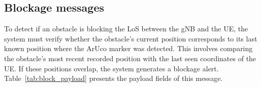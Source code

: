 \begin{table}[H]
    \caption{Components of the Prior to Blockage message's payload.}
    \label{tab:future_block_message}
    \centering
\end{table}




\subsection{Blockage messages}\label{subsec:blocking-messages}
To detect if an obstacle is blocking the LoS between the gNB and the UE, the system must verify whether the obstacle’s current position corresponds to its last known position where the ArUco marker was detected.
This involves comparing the obstacle's most recent recorded position with the last seen coordinates of the UE\@.
If these positions overlap, the system generates a blockage alert.
Table~\ref{tab:block_payload} presents the payload fields of this message.


